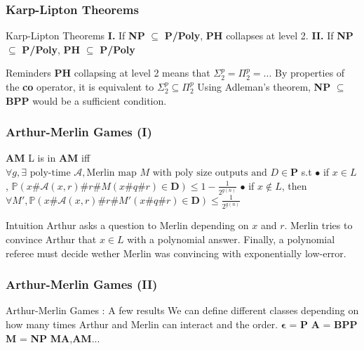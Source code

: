 \documentclass[pdf]{beamer}
\newcommand{\bb}[1]{\mathbb{#1}}
\newcommand{\A}{\mathcal{A}}
\begin{document}
\begin{frame}
\frametitle{Karp-Lipton Theorems}

\begin{alertblock}{Karp-Lipton Theorems}
\textbf{I.} If \textbf{NP} $\subseteq$ \textbf{P/Poly}, \textbf{PH} collapses at level 2.\newline
\textbf{II.} If \textbf{NP} $\subseteq$ \textbf{P/Poly}, \textbf{PH} $\subseteq$ \textbf{P/Poly}\newline
\end{alertblock}   

\begin{exampleblock}{Reminders}
\textbf{PH} collapsing at level 2 means that $\Sigma^p_2 =\Pi^p_2=...$\newline
By properties of the \textbf{co} operator, it is equivalent to $\Sigma^p_2 \subseteq \Pi^p_2$\newline   
Using Adleman's theorem, \textbf{NP} $\subseteq$ \textbf{BPP} would be a sufficient condition.
\end{exampleblock}

\end{frame}

\begin{frame}
\frametitle{Arthur-Merlin Games (I)}

\begin{block}{\textbf{AM}}
L is in \textbf{AM} iff $\forall g, \exists \text{ poly-time } \A, \text{Merlin map } M \text{ with poly size outputs} \text{ and } D \in \textbf{P}$ s.t \newline
$\bullet$ if $x \in L$, $\bb{P}(x\#\A(x,r)\#r\#M(x\#q\#r)\in \mathbf{D}) \leq  1 - \frac{1}{2^{g(n)}}$ \newline    
$\bullet$ if $x \notin L$, then $\forall M',\bb{P}(x\#\A(x,r)\#r\#M'(x\#q\#r)\in \mathbf{D}) \leq  \frac{1}{2^{g(n)}}$
\end{block}

\begin{exampleblock}{Intuition}
Arthur asks a question to Merlin depending on $x$ and $r$.\newline
Merlin tries to convince Arthur that $x \in L$ with a polynomial answer. \newline
Finally, a polynomial referee must decide wether Merlin was convincing with exponentially low-error.
\end{exampleblock}

\end{frame}

\begin{frame}
\frametitle{Arthur-Merlin Games (II)}

\begin{exampleblock}{Arthur-Merlin Games : A few results}
We can define different classes depending on how many times Arthur and Merlin can interact and the order.\newline
$\mathbf{\epsilon}$ = \textbf{P}\newline
\textbf{A} = \textbf{BPP} \newline
\textbf{M} = \textbf{NP}\newline
\textbf{MA},\textbf{AM}...
\end{exampleblock}
\end{frame}
\end{document}
